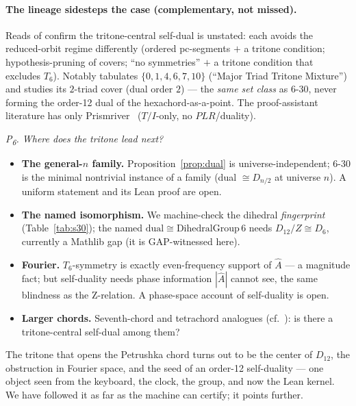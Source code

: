 \documentclass[11pt]{article}
\newcommand{\Dgrp}[1]{D_{#1}}
\newcommand{\Ahat}{\hat{A}}
\newcommand{\question}[1]{\smallskip\noindent\textit{#1}\smallskip}
\begin{document}
\paragraph{The lineage sidesteps the case (complementary, not missed).} Reads of \cite{FS,FN11,FN25}
confirm the tritone-central self-dual is unstated: each avoids the reduced-orbit regime differently
(ordered pc-segments $+$ a tritone condition; hypothesis-pruning of covers; ``no symmetries'' $+$ a
tritone condition that excludes $T_6$). Notably \cite{FN11} tabulates $\{0,1,4,6,7,10\}$ (``Major Triad
Tritone Mixture'') and studies its $2$-triad cover (dual order $2$) --- the \emph{same set class} as
6-30, never forming the order-12 dual of the hexachord-as-a-point. The proof-assistant literature has
only Prismriver~\cite{Prism} ($T/I$-only, no $PLR$/duality).

\question{P\textsubscript{6}. Where does the tritone lead next?}

\begin{itemize}\itemsep2pt
  \item \textbf{The general-$n$ family.} Proposition~\ref{prop:dual} is universe-independent; 6-30 is the
        minimal nontrivial instance of a family (dual $\cong\Dgrp{n/2}$ at universe $n$). A uniform
        statement and its Lean proof are open.
  \item \textbf{The named isomorphism.} We machine-check the dihedral \emph{fingerprint}
        (Table~\ref{tab:s30}); the named $\mathrm{dual}\cong\mathrm{DihedralGroup}\,6$ needs
        $\Dgrp{12}/Z\cong\Dgrp{6}$, currently a Mathlib gap (it is GAP-witnessed here).
  \item \textbf{Fourier.} $T_6$-symmetry is exactly even-frequency support of $\Ahat$ --- a magnitude
        fact; but self-duality needs phase information $|\Ahat|$ cannot see, the same blindness as the
        Z-relation. A phase-space account of self-duality is open.
  \item \textbf{Larger chords.} Seventh-chord and tetrachord analogues (cf.\ \cite{FN25}): is there a
        tritone-central self-dual among them?
\end{itemize}

The tritone that opens the Petrushka chord turns out to be the center of $\Dgrp{12}$, the obstruction in
Fourier space, and the seed of an order-12 self-duality --- one object seen from the keyboard, the
clock, the group, and now the Lean kernel. We have followed it as far as the machine can certify; it
points further.
\end{document}

